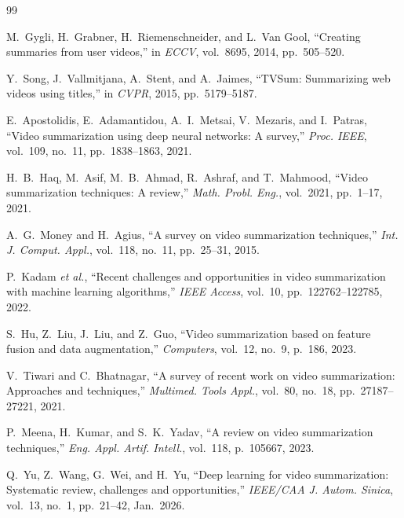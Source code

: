 \documentclass[10pt,conference]{IEEEtran}
\begin{document}
\begin{thebibliography}{99}


M.~Gygli, H.~Grabner, H.~Riemenschneider, and L.~Van Gool,
``Creating summaries from user videos,''
in \textit{ECCV}, vol.~8695, 2014, pp.~505--520.

Y.~Song, J.~Vallmitjana, A.~Stent, and A.~Jaimes,
``TVSum: Summarizing web videos using titles,''
in \textit{CVPR}, 2015, pp.~5179--5187.


E.~Apostolidis, E.~Adamantidou, A.~I.~Metsai, V.~Mezaris, and I.~Patras,
``Video summarization using deep neural networks: A survey,''
\textit{Proc. IEEE}, vol.~109, no.~11, pp.~1838--1863, 2021.

H.~B.~Haq, M.~Asif, M.~B.~Ahmad, R.~Ashraf, and T.~Mahmood,
``Video summarization techniques: A review,''
\textit{Math. Probl. Eng.}, vol.~2021, pp.~1--17, 2021.

A.~G.~Money and H.~Agius,
``A survey on video summarization techniques,''
\textit{Int. J. Comput. Appl.}, vol.~118, no.~11, pp.~25--31, 2015.

P.~Kadam \textit{et al.},
``Recent challenges and opportunities in video summarization with machine
learning algorithms,''
\textit{IEEE Access}, vol.~10, pp.~122762--122785, 2022.

S.~Hu, Z.~Liu, J.~Liu, and Z.~Guo,
``Video summarization based on feature fusion and data augmentation,''
\textit{Computers}, vol.~12, no.~9, p.~186, 2023.

V.~Tiwari and C.~Bhatnagar,
``A survey of recent work on video summarization: Approaches and techniques,''
\textit{Multimed. Tools Appl.}, vol.~80, no.~18, pp.~27187--27221, 2021.

P.~Meena, H.~Kumar, and S.~K.~Yadav,
``A review on video summarization techniques,''
\textit{Eng. Appl. Artif. Intell.}, vol.~118, p.~105667, 2023.

Q.~Yu, Z.~Wang, G.~Wei, and H.~Yu,
``Deep learning for video summarization: Systematic review, challenges and
opportunities,''
\textit{IEEE/CAA J. Autom. Sinica}, vol.~13, no.~1, pp.~21--42, Jan.~2026.


\end{thebibliography}
\end{document}
